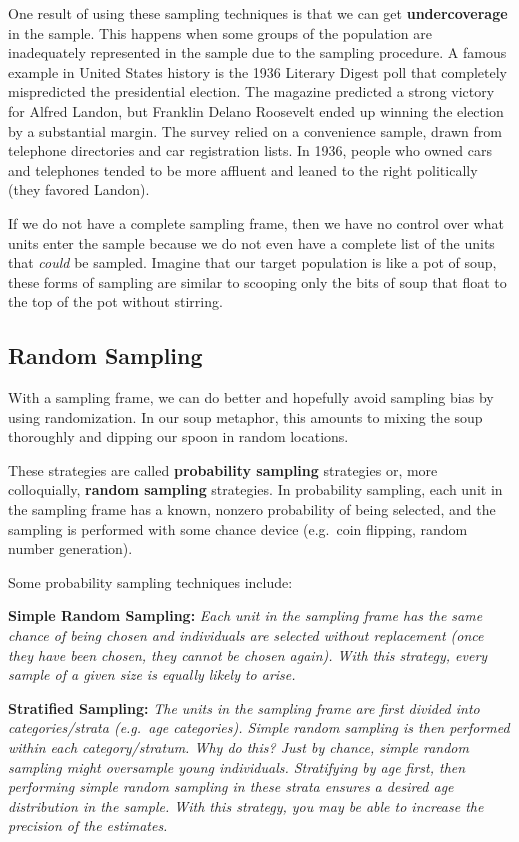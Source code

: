 \documentclass[]{book}
\begin{document}
One result of using these sampling techniques is that we can get \textbf{undercoverage} in the sample. This happens when some groups of the population are inadequately represented in the sample due to the sampling procedure. A famous example in United States history is the 1936 Literary Digest poll that completely mispredicted the presidential election. The magazine predicted a strong victory for Alfred Landon, but Franklin Delano Roosevelt ended up winning the election by a substantial margin. The survey relied on a convenience sample, drawn from telephone directories and car registration lists. In 1936, people who owned cars and telephones tended to be more affluent and leaned to the right politically (they favored Landon).

If we do not have a complete sampling frame, then we have no control over what units enter the sample because we do not even have a complete list of the units that \emph{could} be sampled. Imagine that our target population is like a pot of soup, these forms of sampling are similar to scooping only the bits of soup that float to the top of the pot without stirring.

\hypertarget{random-sampling}{%
\subsection{Random Sampling}\label{random-sampling}}

With a sampling frame, we can do better and hopefully avoid sampling bias by using randomization. In our soup metaphor, this amounts to mixing the soup thoroughly and dipping our spoon in random locations.

These strategies are called \textbf{probability sampling} strategies or, more colloquially, \textbf{random sampling} strategies. In probability sampling, each unit in the sampling frame has a known, nonzero probability of being selected, and the sampling is performed with some chance device (e.g.~coin flipping, random number generation).

Some probability sampling techniques include:

\textbf{Simple Random Sampling:} \emph{Each unit in the sampling frame has the same chance of being chosen and individuals are selected without replacement (once they have been chosen, they cannot be chosen again). With this strategy, every sample of a given size is equally likely to arise.}

\textbf{Stratified Sampling:} \emph{The units in the sampling frame are first divided into categories/strata (e.g.~age categories). Simple random sampling is then performed within each category/stratum. Why do this? Just by chance, simple random sampling might oversample young individuals. Stratifying by age first, then performing simple random sampling in these strata ensures a desired age distribution in the sample. With this strategy, you may be able to increase the precision of the estimates.}
\end{document}
